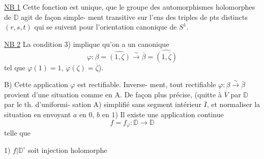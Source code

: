 \uline{NB 1} Cette fonction est unique, 
que le groupe des automorphismes 
holomorphes de $\mathbb D$ agit de façon simple-
ment transitive sur l'ens des
triples  de pts distincts $(r,s,t)$  qui se
suivent pour l'orientation canonique de
 $S^1$. 

\uline{NB 2} La condition 3) implique qu'on a un
 canonique
\[
\varphi:\beta=\widehat{(1,\zeta)}\overset\sim\longrightarrow
\overline\beta=\widehat{(1,\overline\zeta)}
\]
tel que $\varphi(1)=1$, $\varphi(\zeta)=\overline\zeta$).

B) Cette application $\varphi$ est rectifiable. Inverse-
ment, tout  rectifiable $\varphi:\beta\overset\sim\longrightarrow\overline\beta$
provient d'une situation comme en A.
De façon plus précise,  (quitte
à  $\overline V$ par $\mathbb D$ par le th. d'uniformi-
sation A) simplifié sans segment intérieur $\overline I$,
et normaliser la situation en  envoyant
$a$ en $0$, $b$ en $1$)  Il existe
une application continue
\[
f=f_\varphi:\mathbb D\longrightarrow\mathbb D
\]
telle que

1) $f|\mathbb D^\circ$ soit  injection holomorphe
